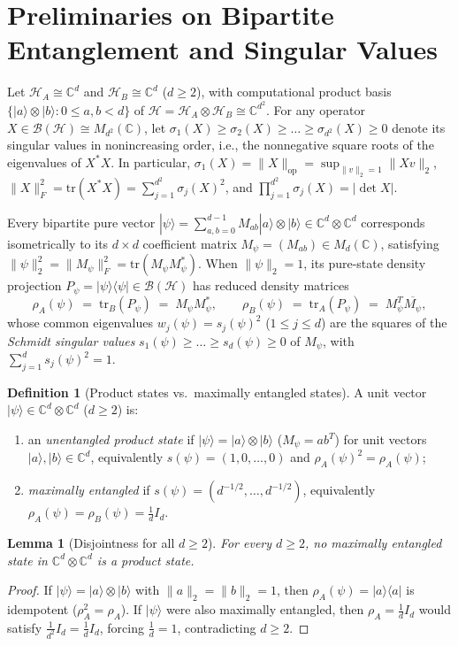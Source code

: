 \documentclass[11pt,a4paper]{article}
\theoremstyle{plain}
\newtheorem{lemma}[theorem]{Lemma}
\theoremstyle{definition}
\newtheorem{definition}[theorem]{Definition}
\newcommand{\C}{\mathbb{C}}
\newcommand{\cH}{\mathcal{H}}
\newcommand{\cB}{\mathcal{B}}
\newcommand{\tr}{\mathrm{tr}}
\newcommand{\op}{\mathrm{op}}
\begin{document}
\section{Preliminaries on Bipartite Entanglement and Singular Values}

Let $\cH_A \cong \C^d$ and $\cH_B \cong \C^d$ ($d \ge 2$), with computational product basis $\{|a\rangle \otimes |b\rangle : 0 \le a, b < d\}$ of $\cH = \cH_A \otimes \cH_B \cong \C^{d^2}$. For any operator $X \in \cB(\cH) \cong M_{d^2}(\C)$, let $\sigma_1(X) \ge \sigma_2(X) \ge \dots \ge \sigma_{d^2}(X) \ge 0$ denote its singular values in nonincreasing order, i.e., the nonnegative square roots of the eigenvalues of $X^* X$. In particular, $\sigma_1(X) = \|X\|_{\op} = \sup_{\|v\|_2 = 1} \|X v\|_2$, $\|X\|_F^2 = \tr(X^* X) = \sum_{j=1}^{d^2} \sigma_j(X)^2$, and $\prod_{j=1}^{d^2} \sigma_j(X) = |\det X|$.

Every bipartite pure vector $|\psi\rangle = \sum_{a,b=0}^{d-1} M_{ab} |a\rangle \otimes |b\rangle \in \C^d \otimes \C^d$ corresponds isometrically to its $d \times d$ coefficient matrix $M_\psi = (M_{ab}) \in M_d(\C)$, satisfying $\|\psi\|_2^2 = \|M_\psi\|_F^2 = \tr(M_\psi M_\psi^*)$. When $\|\psi\|_2 = 1$, its pure-state density projection $P_\psi = |\psi\rangle\langle\psi| \in \cB(\cH)$ has reduced density matrices
\[
  \rho_A(\psi) \;=\; \tr_B(P_\psi) \;=\; M_\psi M_\psi^*, \qquad
  \rho_B(\psi) \;=\; \tr_A(P_\psi) \;=\; M_\psi^T \overline{M_\psi},
\]
whose common eigenvalues $w_j(\psi) = s_j(\psi)^2$ ($1 \le j \le d$) are the squares of the \emph{Schmidt singular values} $s_1(\psi) \ge \dots \ge s_d(\psi) \ge 0$ of $M_\psi$, with $\sum_{j=1}^d s_j(\psi)^2 = 1$.

\begin{definition}[Product states vs.\ maximally entangled states]
A unit vector $|\psi\rangle \in \C^d \otimes \C^d$ ($d \ge 2$) is:
\begin{enumerate}
  \item an \emph{unentangled product state} if $|\psi\rangle = |a\rangle \otimes |b\rangle$ ($M_\psi = a b^T$) for unit vectors $|a\rangle, |b\rangle \in \C^d$, equivalently $s(\psi) = (1, 0, \dots, 0)$ and $\rho_A(\psi)^2 = \rho_A(\psi)$;
  \item \emph{maximally entangled} if $s(\psi) = (d^{-1/2}, \dots, d^{-1/2})$, equivalently $\rho_A(\psi) = \rho_B(\psi) = \frac{1}{d} I_d$.
\end{enumerate}
\end{definition}

\begin{lemma}[Disjointness for all $d \ge 2$]
\label{lem:disjoint}
For every $d \ge 2$, no maximally entangled state in $\C^d \otimes \C^d$ is a product state.
\end{lemma}
\begin{proof}
If $|\psi\rangle = |a\rangle \otimes |b\rangle$ with $\|a\|_2 = \|b\|_2 = 1$, then $\rho_A(\psi) = |a\rangle\langle a|$ is idempotent ($\rho_A^2 = \rho_A$). If $|\psi\rangle$ were also maximally entangled, then $\rho_A = \frac{1}{d} I_d$ would satisfy $\frac{1}{d^2} I_d = \frac{1}{d} I_d$, forcing $\frac{1}{d} = 1$, contradicting $d \ge 2$.
\end{proof}
\end{document}
